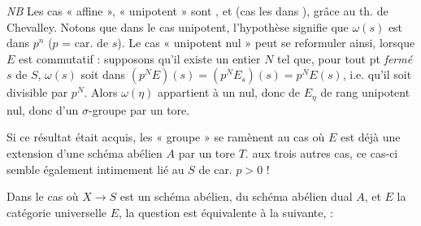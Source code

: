 \documentclass[11pt,a4paper]{article}
\begin{document}
\emph{NB} Les cas «  affine », « unipotent » sont
, et \uncertain{\ill{}} 
(cas les  \ill{} dans \uncertain{\ill{}} ),
grâce au th. de Chevalley. Notons que dans le cas unipotent, l'hypothèse
signifie que $\omega(s)$ est dans $p^{n}$ ($p$ = car. de $s$). Le cas
«  unipotent nul » peut se reformuler ainsi, lorsque $E$ est
commutatif : supposons qu'il existe un entier $N$ tel que, pour tout pt
\emph{fermé} $s$ de $S$, $\omega(s)$ soit \struck{\ill{}} dans
$(p^N E)(s) = (p^N E_s)(s) = p^N E(s)$, i.e. qu'il soit divisible par $p^N$.
Alors $\omega(\eta)$ appartient à un 
 nul, donc  de $E_\eta$ de rang
\struck{\ill{}} unipotent nul, donc  d'un $\sigma$-groupe
 \ill{} par un tore.

Si ce résultat était acquis, \struck{\ill{}} les «  \ill{}
groupe » se ramènent au cas où $E$ est déjà une extension d'une schéma abélien
$A$ par un tore $T$.
\uncertain{\ill{}}  aux trois autres cas, ce cas-ci
semble également intimement lié au  
$S$ de car. $p>0$ \uncertain{\ill{}} !


Dans le cas où $X\to S$ est un schéma abélien, \struck{\ill{}}
 du schéma abélien dual $A$, et $E$ la
catégorie  universelle $E$, la question est
équivalente à la suivante, \struck{\ill{}} :
\end{document}
